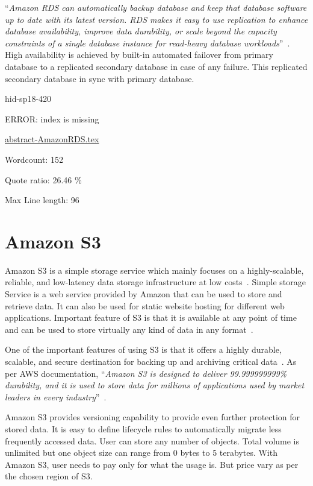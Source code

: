 \color{blue}``\emph{Amazon RDS can automatically backup database and keep that database software
up to date with its latest version. RDS makes it easy to use replication to
enhance database availability, improve data durability, or scale beyond the
capacity constraints of a single database instance for read-heavy database
workloads}''\color{black}~\cite{hid-sp18-420-amazon-RDS-FAQ}. High availability is achieved by
built-in automated failover from primary database to a replicated secondary
database in case of any failure. This replicated secondary database in sync with
primary database.


\begin{IU}

hid-sp18-420

ERROR: index is missing

\href{https://github.com/cloudmesh-community/hid-sp18-420/blob/master//technology/abstract-AmazonRDS.tex}{abstract-AmazonRDS.tex}

 

Wordcount: 152


Quote ratio: 26.46 \%
 
Max Line length: 96
\end{IU}

\section{Amazon S3}

Amazon S3 is a simple storage service which mainly focuses on a highly-scalable,
reliable, and low-latency data storage infrastructure at low
costs~\cite{hid-sp18-420-amazon-S3-FAQ}. Simple storage Service is a web service
provided by Amazon that can be used to store and retrieve data. It can also be
used for static website hosting for different web applications. Important
feature of S3 is that it is available at any point of time and can be used to
store virtually any kind of data in any
format~\cite{hid-sp18-420-amazon-S3-FAQ}.

One of the important features of using S3 is that it offers a highly durable,
scalable, and secure destination for backing up and archiving critical
data~\cite{hid-sp18-420-amazon-S3}. As per AWS documentation, \color{blue}``\emph{Amazon S3 is
designed to deliver 99.999999999\% durability, and it is used to store data for
millions of applications used by market leaders in every
industry}''\color{black}~\cite{hid-sp18-420-amazon-S3}.

Amazon S3 provides versioning capability to provide even further protection for
stored data. It is easy to define lifecycle rules to automatically migrate less
frequently accessed data. User can store any number of objects. Total volume is
unlimited but one object size can range from 0 bytes to 5 terabytes. With Amazon
S3, user needs to pay only for what the usage is. But price vary as per the
chosen region of S3.


